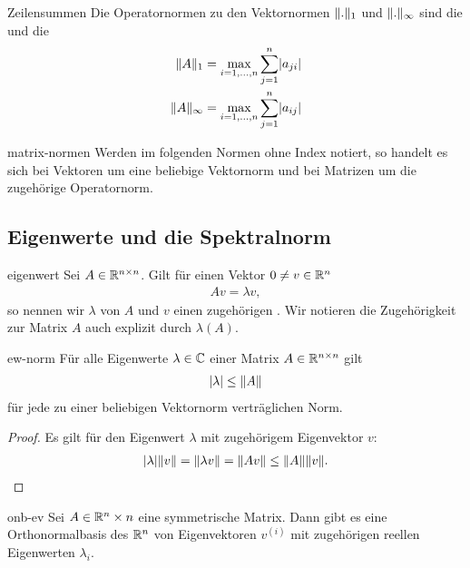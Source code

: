 \begin{Beispiel}{Zeilensummen}
  Die Operatornormen zu den Vektornormen $\lVert.\rVert_1$ und
  $\lVert.\rVert_\infty$ sind die  und die
  \begin{align}
    \lVert A\rVert_1 &= \max_{i=1,\dots,n} \sum_{j=1}^n \lvert a_{ji}\rvert\\
    \lVert A\rVert_\infty &= \max_{i=1,\dots,n} \sum_{j=1}^n \lvert a_{ij}\rvert
  \end{align}
\end{Beispiel}

\begin{Notation}{matrix-normen}
  Werden im folgenden Normen ohne Index notiert, so handelt es sich
  bei Vektoren um eine beliebige Vektornorm und bei Matrizen um die
  zugehörige Operatornorm.
\end{Notation}

\subsection{Eigenwerte und die Spektralnorm}

\begin{Definition}{eigenwert}
  Sei $A\in \mathbb R^{n\times n}$. Gilt für einen Vektor $0\neq v\in \mathbb R^n$
  \begin{gather}
    Av = \lambda v,
  \end{gather}
  so nennen wir $\lambda$  von $A$ und $v$ einen
  zugehörigen . Wir notieren die Zugehörigkeit zur
  Matrix $A$ auch explizit durch $\lambda(A)$.
\end{Definition}

\begin{Lemma}{ew-norm}
  Für alle Eigenwerte $\lambda\in\mathbb C$ einer Matrix $A\in\mathbb R^{n\times n}$ gilt
  \begin{gather}
    \lvert\lambda\rvert \le \lVert A\rVert
  \end{gather}
  für jede zu einer beliebigen Vektornorm verträglichen Norm.
\end{Lemma}

\begin{proof}
  Es gilt für den Eigenwert $\lambda$ mit zugehörigem Eigenvektor $v$:
  \begin{align}
    \lvert\lambda\rvert\lVert v\rVert = \lVert\lambda v\rVert = \lVert Av\rVert \le \lVert A\rVert\lVert v\rVert.
  \end{align}
\end{proof}

\begin{Satz}{onb-ev}
  Sei $A\in \mathbb R^n\times n$ eine symmetrische Matrix. Dann gibt es eine
  Orthonormalbasis des $\mathbb R^n$ von Eigenvektoren $v^{(i)}$ mit zugehörigen
  reellen Eigenwerten $\lambda_i$.
\end{Satz}


